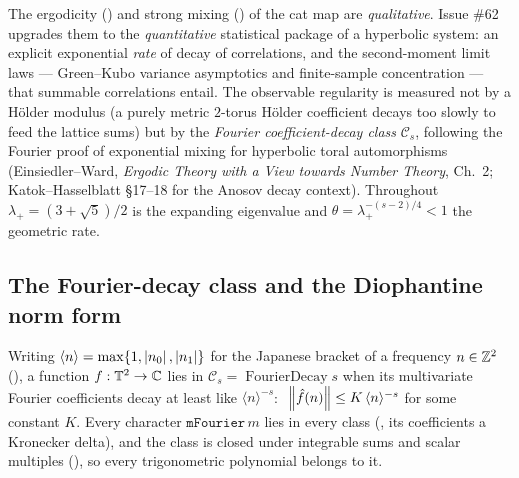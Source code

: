 The ergodicity () and strong mixing () of the cat map
are \emph{qualitative}. Issue \#62 upgrades them to the \emph{quantitative} statistical package of a
hyperbolic system: an explicit exponential \emph{rate} of decay of correlations, and the
second-moment limit laws --- Green--Kubo variance asymptotics and finite-sample concentration --- that
summable correlations entail. The observable regularity is measured not by a Hölder modulus (a
purely metric \(2\)-torus Hölder coefficient decays too slowly to feed the lattice sums) but by the
\emph{Fourier coefficient-decay class} \(\mathcal C_s\), following the Fourier proof of exponential
mixing for hyperbolic toral automorphisms (Einsiedler--Ward, \emph{Ergodic Theory with a View
towards Number Theory}, Ch.~2; Katok--Hasselblatt \S17--18 for the Anosov decay context). Throughout
\(\lambda_+ = (3+\sqrt5)/2\) is the expanding eigenvalue and \(\theta = \lambda_+^{-(s-2)/4} < 1\)
the geometric rate.

\subsection{The Fourier-decay class and the Diophantine norm form}

\begin{definition}\label{FourierDecay}
  \leanok
  Writing \(\langle n\rangle = \max\{1, \left\lvert n_0 \right\rvert, \left\lvert n_1 \right\rvert\}\) for the Japanese bracket of a
  frequency \(n\in\mathbb{Z}^2\) (), a function \(f:\mathbb{T}^2\to\mathbb{C}\)
  lies in \(\mathcal C_s = \operatorname{FourierDecay} s\) when its multivariate Fourier coefficients
  decay at least like \(\langle n\rangle^{-s}\): \(\ \left\lVert \hat f(n) \right\rVert \le K\,\langle n\rangle^{-s}\)
  for some constant \(K\). Every character \(\texttt{mFourier}\,m\) lies in every class
  (, its coefficients a Kronecker delta), and
  the class is closed under integrable sums and scalar multiples
  (), so every trigonometric polynomial
  belongs to it.
\end{definition}

